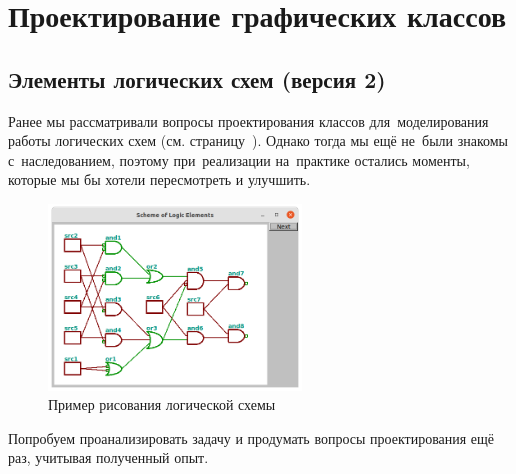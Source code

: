 
\chapter{Проектирование графических классов}

\section{Элементы логических схем (версия 2)}
Ранее мы рассматривали вопросы проектирования классов для~моделирования работы логических схем (см. страницу~\pageref{logic:elemfirst}). Однако тогда мы ещё не~были знакомы с~наследованием, поэтому при~реализации на~практике остались моменты, которые мы бы хотели пересмотреть и улучшить.

\begin{figure}[h]
  {\centering
    \includegraphics[width=0.6\textwidth]{images/logic_shapes.png}

  }
  \caption{Пример рисования логической схемы}
  \label{fig:logicshapes}
\end{figure}

Попробуем проанализировать задачу и продумать вопросы проектирования ещё раз, учитывая полученный опыт.



